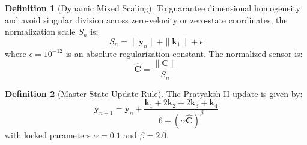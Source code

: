 \documentclass[11pt,a4paper]{article}
\theoremstyle{plain}
\theoremstyle{definition}
\newtheorem{definition}{Definition}
\begin{document}
\begin{definition}[Dynamic Mixed Scaling]
To guarantee dimensional homogeneity and avoid singular division across zero-velocity or zero-state coordinates, the normalization scale $S_n$ is:
\begin{equation}
S_n = \|\mathbf{y}_n\| + \|\mathbf{k}_1\| + \epsilon
\end{equation}
where $\epsilon = 10^{-12}$ is an absolute regularization constant. The normalized sensor is:
\begin{equation}
\hat{\mathbf{C}} = \frac{\|\mathbf{C}\|}{S_n}
\end{equation}
\end{definition}

\begin{definition}[Master State Update Rule]
The Pratyaksh-II update is given by:
\begin{equation}
\mathbf{y}_{n+1} = \mathbf{y}_n + \frac{\mathbf{k}_1 + 2\mathbf{k}_2 + 2\mathbf{k}_3 + \mathbf{k}_4}{6 + (\alpha \hat{\mathbf{C}})^\beta}
\end{equation}
with locked parameters $\alpha = 0.1$ and $\beta = 2.0$.
\end{definition}
\end{document}

